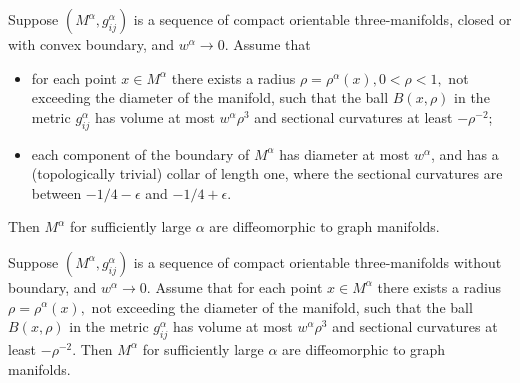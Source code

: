 \begin{proposition}
  \label{prop:cz-perelman-collapsing-graph-manifold-criterion}
Suppose $(M^{\alpha},g^{\alpha}_{ij})$ is a
sequence of compact orientable three-manifolds, closed or with
convex boundary, and $w^{\alpha}\rightarrow  0$. Assume that
\begin{itemize}
\item[(1)] for each point $x \in M^{\alpha}$ there exists a radius
$\rho = \rho^{\alpha}(x), 0<\rho<1,$ not exceeding the diameter of
the manifold, such that the ball $B(x,\rho)$ in the metric
$g^{\alpha}_{ij}$ has volume at most $w^{\alpha}\rho^3$ and
sectional curvatures at least $-\rho^{-2}$; \item[(2)] each
component of the boundary of $M^{\alpha}$ has diameter at most
$w^{\alpha}$, and has a (topologically trivial) collar of length
one, where the sectional curvatures are between $-1/4 - \epsilon$
and $-1/4 + \epsilon$.
\end{itemize}

Then $M^{\alpha}$ for sufficiently large $\alpha$ are
diffeomorphic to graph manifolds.
\end{proposition}
\begin{theorem}
  \label{thm:cz-shioya-yamaguchi-closed-collapsing-graph-manifolds}
Suppose
$(M^{\alpha},g^{\alpha}_{ij})$ is a sequence of compact orientable
three-manifolds without boundary, and $w^{\alpha}\rightarrow 0$.
Assume that for each point $x \in M^{\alpha}$ there exists a
radius $\rho = \rho^{\alpha}(x),$ not exceeding the diameter of
the manifold, such that the ball $B(x,\rho)$ in the metric
$g^{\alpha}_{ij}$ has volume at most $w^{\alpha}\rho^3$ and
sectional curvatures at least $-\rho^{-2}$. Then $M^{\alpha}$ for
sufficiently large $\alpha$ are diffeomorphic to graph manifolds.
\end{theorem}
